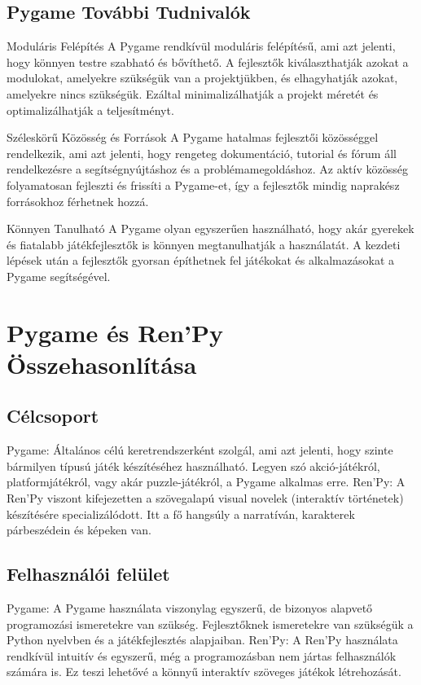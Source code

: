 \subsection{Pygame További Tudnivalók}

Moduláris Felépítés
A Pygame rendkívül moduláris felépítésű, ami azt jelenti, hogy könnyen testre szabható és bővíthető. A fejlesztők kiválaszthatják azokat a modulokat, amelyekre szükségük van a projektjükben, és elhagyhatják azokat, amelyekre nincs szükségük. Ezáltal minimalizálhatják a projekt méretét és optimalizálhatják a teljesítményt.

Széleskörű Közösség és Források
A Pygame hatalmas fejlesztői közösséggel rendelkezik, ami azt jelenti, hogy rengeteg dokumentáció, tutorial és fórum áll rendelkezésre a segítségnyújtáshoz és a problémamegoldáshoz. Az aktív közösség folyamatosan fejleszti és frissíti a Pygame-et, így a fejlesztők mindig naprakész forrásokhoz férhetnek hozzá.

Könnyen Tanulható
A Pygame olyan egyszerűen használható, hogy akár gyerekek és fiatalabb játékfejlesztők is könnyen megtanulhatják a használatát. A kezdeti lépések után a fejlesztők gyorsan építhetnek fel játékokat és alkalmazásokat a Pygame segítségével.


\section{Pygame és Ren'Py Összehasonlítása}

\subsection{Célcsoport}

Pygame: Általános célú keretrendszerként szolgál, ami azt jelenti, hogy szinte bármilyen típusú játék készítéséhez használható. Legyen szó akció-játékról, platformjátékról, vagy akár puzzle-játékról, a Pygame alkalmas erre.
Ren'Py: A Ren'Py viszont kifejezetten a szövegalapú visual novelek (interaktív történetek) készítésére specializálódott. Itt a fő hangsúly a narratíván, karakterek párbeszédein és képeken van.

\subsection{Felhasználói felület}

Pygame: A Pygame használata viszonylag egyszerű, de bizonyos alapvető programozási ismeretekre van szükség. Fejlesztőknek ismeretekre van szükségük a Python nyelvben és a játékfejlesztés alapjaiban.
Ren'Py: A Ren'Py használata rendkívül intuitív és egyszerű, még a programozásban nem jártas felhasználók számára is. Ez teszi lehetővé a könnyű interaktív szöveges játékok létrehozását.

